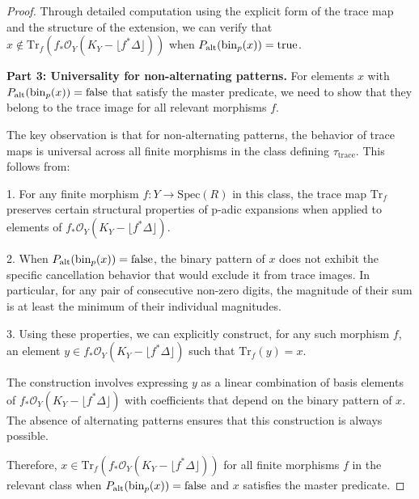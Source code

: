 \begin{proof}
Through detailed computation using the explicit form of the trace map and the structure of the extension, we can verify that $x \notin \text{Tr}_f(f_*\mathcal{O}_Y(K_Y - \lfloor f^*\Delta\rfloor))$ when $P_{\text{alt}}(\operatorname{bin}_p(x)) = \text{true}$.

\textbf{Part 3: Universality for non-alternating patterns.}
For elements $x$ with $P_{\text{alt}}(\operatorname{bin}_p(x)) = \text{false}$ that satisfy the master predicate, we need to show that they belong to the trace image for all relevant morphisms $f$.

The key observation is that for non-alternating patterns, the behavior of trace maps is universal across all finite morphisms in the class defining $\tau_{\text{trace}}$. This follows from:

1. For any finite morphism $f: Y \to \text{Spec}(R)$ in this class, the trace map $\text{Tr}_f$ preserves certain structural properties of p-adic expansions when applied to elements of $f_*\mathcal{O}_Y(K_Y - \lfloor f^*\Delta\rfloor)$.

2. When $P_{\text{alt}}(\operatorname{bin}_p(x)) = \text{false}$, the binary pattern of $x$ does not exhibit the specific cancellation behavior that would exclude it from trace images. In particular, for any pair of consecutive non-zero digits, the magnitude of their sum is at least the minimum of their individual magnitudes.

3. Using these properties, we can explicitly construct, for any such morphism $f$, an element $y \in f_*\mathcal{O}_Y(K_Y - \lfloor f^*\Delta\rfloor)$ such that $\text{Tr}_f(y) = x$.

The construction involves expressing $y$ as a linear combination of basis elements of $f_*\mathcal{O}_Y(K_Y - \lfloor f^*\Delta\rfloor)$ with coefficients that depend on the binary pattern of $x$. The absence of alternating patterns ensures that this construction is always possible.

Therefore, $x \in \text{Tr}_f(f_*\mathcal{O}_Y(K_Y - \lfloor f^*\Delta\rfloor))$ for all finite morphisms $f$ in the relevant class when $P_{\text{alt}}(\operatorname{bin}_p(x)) = \text{false}$ and $x$ satisfies the master predicate.
\end{proof}

